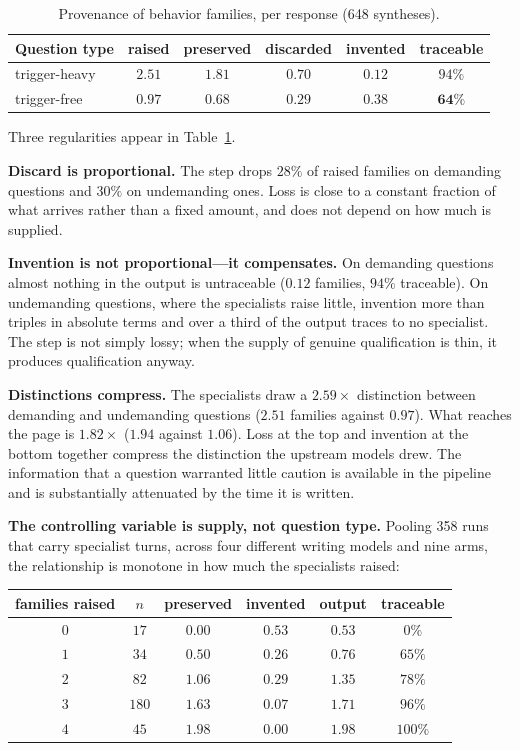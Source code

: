 \documentclass[11pt]{article}
\begin{document}
\begin{table}[t]
\centering
\caption{Provenance of behavior families, per response (648 syntheses).}
\label{tab:prov}
\begin{tabular}{lccccc}
\toprule
Question type & raised & preserved & discarded & invented & traceable \\
\midrule
trigger-heavy & $2.51$ & $1.81$ & $0.70$ & $0.12$ & $94\%$ \\
trigger-free & $0.97$ & $0.68$ & $0.29$ & $\mathbf{0.38}$ & $\mathbf{64\%}$ \\
\bottomrule
\end{tabular}
\end{table}

Three regularities appear in Table~\ref{tab:prov}.

\textbf{Discard is proportional.} The step drops $28\%$ of raised families on
demanding questions and $30\%$ on undemanding ones. Loss is close to a
constant fraction of what arrives rather than a fixed amount, and does not
depend on how much is supplied.

\textbf{Invention is not proportional---it compensates.} On demanding
questions almost nothing in the output is untraceable ($0.12$ families,
$94\%$ traceable). On undemanding questions, where the specialists raise
little, invention more than triples in absolute terms and over a third of the
output traces to no specialist. The step is not simply lossy; when the supply
of genuine qualification is thin, it produces qualification anyway.

\textbf{Distinctions compress.} The specialists draw a $2.59\times$ distinction
between demanding and undemanding questions ($2.51$ families against $0.97$).
What reaches the page is $1.82\times$ ($1.94$ against $1.06$). Loss at the top
and invention at the bottom together compress the distinction the upstream
models drew. The information that a question warranted little caution is
available in the pipeline and is substantially attenuated by the time it is
written.

\textbf{The controlling variable is supply, not question type.} Pooling 358
runs that carry specialist turns, across four different writing models and
nine arms, the relationship is monotone in how much the specialists raised:

\begin{center}\small
\begin{tabular}{cccccc}
\toprule
families raised & $n$ & preserved & invented & output & traceable \\
\midrule
$0$ & $17$ & $0.00$ & $0.53$ & $0.53$ & $0\%$ \\
$1$ & $34$ & $0.50$ & $0.26$ & $0.76$ & $65\%$ \\
$2$ & $82$ & $1.06$ & $0.29$ & $1.35$ & $78\%$ \\
$3$ & $180$ & $1.63$ & $0.07$ & $1.71$ & $96\%$ \\
$4$ & $45$ & $1.98$ & $0.00$ & $1.98$ & $100\%$ \\
\bottomrule
\end{tabular}
\end{center}
\end{document}

